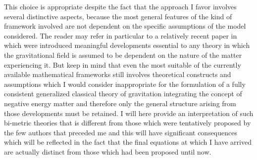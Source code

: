 \documentclass[notitlepage,12pt]{report}
\begin{document}
This choice is appropriate despite the fact that the approach I favor involves several distinctive aspects, because the most general features of the kind of framework involved are not dependent on the specific assumptions of the model considered. The reader may refer in particular to a relatively recent paper \cite{Hossenfelder-1} in which were introduced meaningful developments essential to any theory in which the gravitational field is assumed to be dependent on the nature of the matter experiencing it. But keep in mind that even the most suitable of the currently available mathematical frameworks still involves theoretical constructs and assumptions which I would consider inappropriate for the formulation of a fully consistent generalized classical theory of gravitation integrating the concept of negative energy matter and therefore only the general structure arising from those developments must be retained. I will here provide an interpretation of such bi-metric theories that is different from those which were tentatively proposed by the few authors that preceded me and this will have significant consequences which will be reflected in the fact that the final equations at which I have arrived are actually distinct from those which had been proposed until now.
\end{document}
